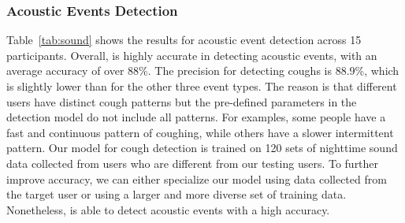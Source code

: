  \subsubsection{Acoustic Events Detection}
 Table~\ref{tab:sound} shows the results for acoustic event detection across 15 participants. Overall, \systemname is highly accurate in
 detecting acoustic events, with an average accuracy of over 88\%. The precision for detecting coughs is
88.9\%, which is slightly lower than for the other three event types. The reason is that different users have distinct cough patterns but
the pre-defined parameters in the detection model do not include all patterns. For examples, some people have a fast and continuous pattern
of coughing, while others have a slower intermittent pattern. Our model for cough detection is trained on 120 sets of nighttime sound data
collected from users who are different from our testing users. To further improve accuracy, we can either specialize our model using data
collected from the target user or using a larger and more diverse set of training data. Nonetheless, \systemname is able to detect acoustic
events with a high accuracy.


